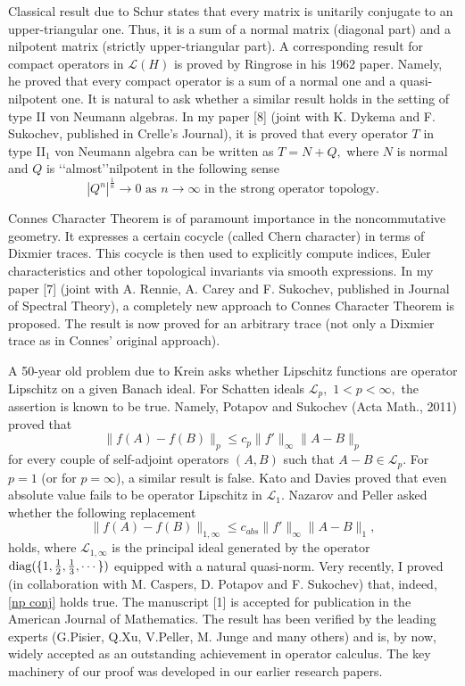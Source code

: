 \documentclass[a4paper]{amsart}
\begin{document}
Classical result due to Schur states that every matrix is unitarily conjugate to an upper-triangular one. Thus, it is a sum of a normal matrix (diagonal part) and a nilpotent matrix (strictly upper-triangular part). A corresponding result for compact operators in $\mathcal{L}(H)$ is proved by Ringrose in his 1962 paper. Namely, he proved that every compact operator is a sum of a normal one and a quasi-nilpotent one. It is natural to ask whether a similar result holds in the setting of type II von Neumann algebras. In my paper [8] (joint with K. Dykema and F. Sukochev, published in Crelle's Journal), it is proved that every operator $T$ in type II$_1$ von Neumann algebra can be written as $T=N+Q,$ where $N$ is normal and $Q$ is \lq\lq almost\rq\rq nilpotent in the following sense
$$|Q^n|^{\frac1n}\to0\mbox{ as }n\to\infty\mbox{ in the strong operator topology.}$$

Connes Character Theorem is of paramount importance in the noncommutative geometry. It expresses a certain cocycle (called Chern character) in terms of Dixmier traces. This cocycle is then used to explicitly compute indices, Euler characteristics and other topological invariants via smooth expressions. In my paper [7] (joint with A. Rennie, A. Carey and F. Sukochev, published in Journal of Spectral Theory), a completely new approach to Connes Character Theorem is proposed. The result is now proved for an arbitrary trace (not only a Dixmier trace as in Connes' original approach).

A 50-year old problem due to Krein asks whether Lipschitz functions are operator Lipschitz on a given Banach ideal. For Schatten ideals $\mathcal{L}_p,$ $1<p<\infty,$ the assertion is known to be true. Namely, Potapov and Sukochev (Acta Math., 2011) proved that
$$\|f(A)-f(B)\|_p\leq c_p\|f'\|_{\infty}\|A-B\|_p$$
for every couple of self-adjoint operators $(A,B)$ such that $A-B\in\mathcal{L}_p.$ For $p=1$ (or for $p=\infty$), a similar result is false. Kato and Davies proved that even absolute value fails to be operator Lipschitz in $\mathcal{L}_1.$ Nazarov and Peller asked whether the following replacement
\begin{equation}\label{np conj}
\|f(A)-f(B)\|_{1,\infty}\leq c_{abs}\|f'\|_{\infty}\|A-B\|_1,
\end{equation}
holds, where $\mathcal{L}_{1,\infty}$ is the principal ideal generated by the operator ${\rm diag}(\{1,\frac12,\frac13,\cdots\})$ equipped with a natural quasi-norm. Very recently, I proved (in collaboration with M. Caspers, D. Potapov and F. Sukochev) that, indeed, \eqref{np conj} holds true. The manuscript [1] is accepted for publication in the American Journal of Mathematics. The result has been verified by the leading experts (G.Pisier, Q.Xu, V.Peller, M. Junge and many others) and is, by now, widely accepted as an outstanding achievement in operator calculus. The key machinery of our proof was developed in our earlier research papers.
\end{document}
